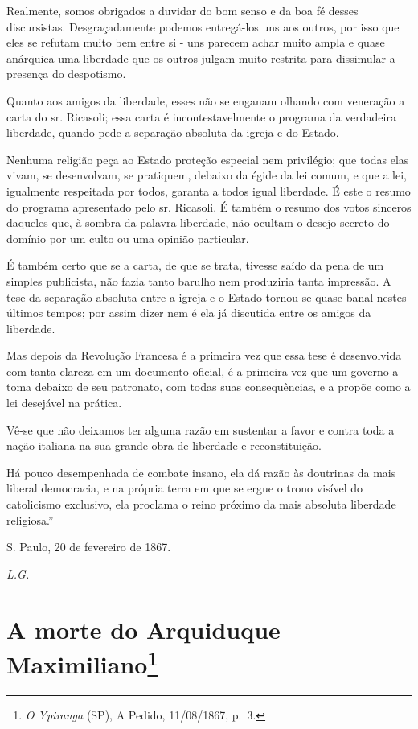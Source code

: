 Realmente, somos obrigados a duvidar do bom senso e da boa fé desses
discursistas. Desgraçadamente podemos entregá-los uns aos outros, por
isso que eles se refutam muito bem entre si - uns parecem achar muito
ampla e quase anárquica uma liberdade que os outros julgam muito
restrita para dissimular a presença do despotismo.

Quanto aos amigos da liberdade, esses não se enganam olhando com
veneração a carta do sr. Ricasoli; essa carta é incontestavelmente o
programa da verdadeira liberdade, quando pede a separação absoluta da
igreja e do Estado.

Nenhuma religião peça ao Estado proteção especial nem privilégio; que
todas elas vivam, se desenvolvam, se pratiquem, debaixo da égide da lei
comum, e que a lei, igualmente respeitada por todos, garanta a todos
igual liberdade. É este o resumo do programa apresentado pelo sr.
Ricasoli. É também o resumo dos votos sinceros daqueles que, à sombra da
palavra liberdade, não ocultam o desejo secreto do domínio por um culto
ou uma opinião particular.

É também certo que se a carta, de que se trata, tivesse saído da pena de
um simples publicista, não fazia tanto barulho nem produziria tanta
impressão. A tese da separação absoluta entre a igreja e o Estado
tornou-se quase banal nestes últimos tempos; por assim dizer nem é ela
já discutida entre os amigos da liberdade.

Mas depois da Revolução Francesa é a primeira vez que essa tese é
desenvolvida com tanta clareza em um documento oficial, é a primeira vez
que um governo a toma debaixo de seu patronato, com todas suas
consequências, e a propõe como a lei desejável na prática.

Vê-se que não deixamos ter alguma razão em sustentar a favor e contra
toda a nação italiana na sua grande obra de liberdade e reconstituição.

Há pouco desempenhada de combate insano, ela dá razão às doutrinas da
mais liberal democracia, e na própria terra em que se ergue o trono
visível do catolicismo exclusivo, ela proclama o reino próximo da mais
absoluta liberdade religiosa.''

S. Paulo, 20 de fevereiro de 1867.

\emph{L.G.}

\chapter{A morte do Arquiduque Maximiliano\footnote{\emph{O Ypiranga} (SP), A Pedido,
  11/08/1867, p.~3.}}

